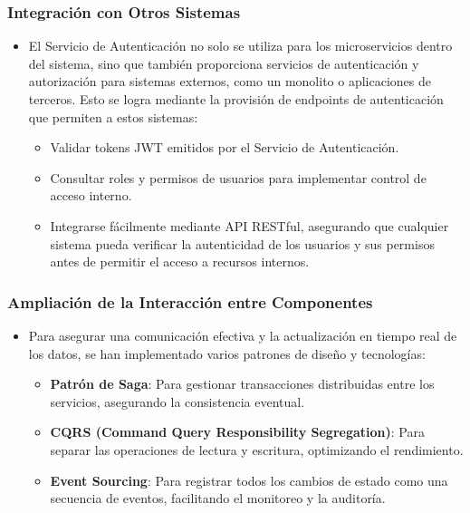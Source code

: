 \subsubsection{Integración con Otros Sistemas}
\begin{itemize}
    \item El Servicio de Autenticación no solo se utiliza para los microservicios dentro del sistema, sino que también proporciona servicios de autenticación y autorización para sistemas externos, como un monolito o aplicaciones de terceros. Esto se logra mediante la provisión de endpoints de autenticación que permiten a estos sistemas:
          \begin{itemize}
              \item Validar tokens JWT emitidos por el Servicio de Autenticación.
              \item Consultar roles y permisos de usuarios para implementar control de acceso interno.
              \item Integrarse fácilmente mediante API RESTful, asegurando que cualquier sistema pueda verificar la autenticidad de los usuarios y sus permisos antes de permitir el acceso a recursos internos.
          \end{itemize}
\end{itemize}

\subsubsection{Ampliación de la Interacción entre Componentes}
\begin{itemize}
    \item Para asegurar una comunicación efectiva y la actualización en tiempo real de los datos, se han implementado varios patrones de diseño y tecnologías:
          \begin{itemize}
              \item \textbf{Patrón de Saga}: Para gestionar transacciones distribuidas entre los servicios, asegurando la consistencia eventual.
              \item \textbf{CQRS (Command Query Responsibility Segregation)}: Para separar las operaciones de lectura y escritura, optimizando el rendimiento.
              \item \textbf{Event Sourcing}: Para registrar todos los cambios de estado como una secuencia de eventos, facilitando el monitoreo y la auditoría.
          \end{itemize}
\end{itemize}

